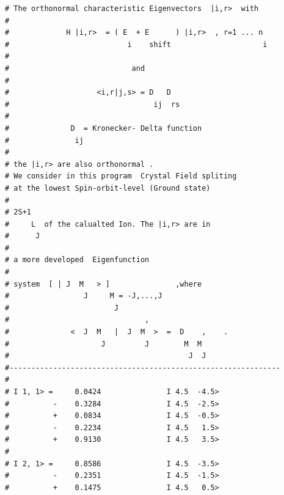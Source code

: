 \begin{enumerate}
{\begin{verbatim}
# The orthonormal characteristic Eigenvectors  |i,r>  with     
#                                                              
#             H |i,r>  = ( E  + E      ) |i,r>  , r=1 ... n    
#                           i    shift                     i   
#                                                              
#                            and                               
#                                                              
#                    <i,r|j,s> = D   D                         
#                                 ij  rs                       
#                                                              
#              D  = Kronecker- Delta function                  
#               ij                                             
#                                                              
# the |i,r> are also orthonormal .                             
# We consider in this program  Crystal Field spliting          
# at the lowest Spin-orbit-level (Ground state)                
#                                                              
# 2S+1                                                         
#     L  of the calualted Ion. The |i,r> are in                
#      J                                                       
#                                                              
# a more developed  Eigenfunction   			    
#                                                              
# system  [ | J  M   > ]               ,where                  
#                 J     M = -J,...,J                           
#                        J                                     
#                               ,                              
#              <  J  M   |  J  M  >  =  D    ,    .            
#                     J         J        M  M                  
#                                         J  J                 
#--------------------------------------------------------------
#                                                              
# I 1, 1> =     0.0424               I 4.5  -4.5>              
#          -    0.3284               I 4.5  -2.5>              
#          +    0.0834               I 4.5  -0.5>              
#          -    0.2234               I 4.5   1.5>              
#          +    0.9130               I 4.5   3.5>              
#                                                              
# I 2, 1> =     0.8586               I 4.5  -3.5>              
#          -    0.2351               I 4.5  -1.5>              
#          +    0.1475               I 4.5   0.5>              

\end{verbatim}}
\end{enumerate}
